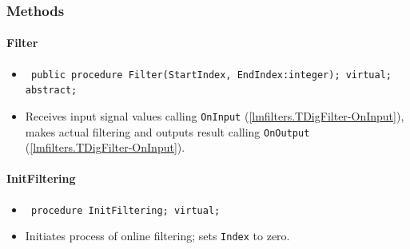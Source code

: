 \documentclass[12pt,a4paper,oneside]{report}
\newcommand{\declarationitem}[1]{{\addfontfeatures{FakeSlant} #1}}
\newcommand{\descriptiontitle}[1]{{\addfontfeatures{FakeSlant}#1}}
\newcommand{\code}[1]{\texttt{#1}}
\begin{document}
\subsubsection{Methods}
\paragraph{Filter}
\label{lmfilters.TDigFilter-Filter}
\begin{itemize}\item[\declarationitem{Declaration}\hfill]
	\begin{flushleft}
		\code{
			public procedure Filter(StartIndex, EndIndex:integer); virtual; abstract;}
	\end{flushleft}
	\par
	\item[\descriptiontitle{Description}]
	Receives input signal values calling \code{OnInput} (\ref{lmfilters.TDigFilter-OnInput}), makes actual filtering and outputs result calling \code{OnOutput} (\ref{lmfilters.TDigFilter-OnInput}).
\end{itemize}
\paragraph{InitFiltering}
\label{lmfilters.TDigFilter-InitFiltering}
\begin{itemize}\item[\declarationitem{Declaration}\hfill]
	\begin{flushleft}
		\code{
			procedure InitFiltering; virtual;}
	\end{flushleft}
	\item[\descriptiontitle{Description}] Initiates process of online filtering; sets \code{Index} to zero.
\end{itemize}
\end{document}
